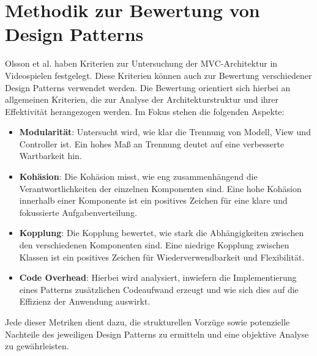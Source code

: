 
\chapter{Methodik zur Bewertung von Design Patterns}
\label{chap:methodik}

Olsson et al. \cite{olsson2015evolution} haben Kriterien zur Untersuchung der \ac{MVC}-Architektur in Videospielen festgelegt. Diese Kriterien können auch zur Bewertung verschiedener Design Patterns verwendet werden. Die Bewertung orientiert sich hierbei an allgemeinen Kriterien, die zur Analyse der Architekturstruktur und ihrer Effektivität herangezogen werden. Im Fokus stehen die folgenden Aspekte:

\begin{itemize}
    \item \textbf{Modularität}: Untersucht wird, wie klar die Trennung von Modell, View und Controller ist. Ein hohes Maß an Trennung deutet auf eine verbesserte Wartbarkeit hin.
    
    \item \textbf{Kohäsion}: Die Kohäsion misst, wie eng zusammenhängend die Verantwortlichkeiten der einzelnen Komponenten sind. Eine hohe Kohäsion innerhalb einer Komponente ist ein positives Zeichen für eine klare und fokussierte Aufgabenverteilung.
    
    \item \textbf{Kopplung}: Die Kopplung bewertet, wie stark die Abhängigkeiten zwischen den verschiedenen Komponenten sind. Eine niedrige Kopplung zwischen Klassen ist ein positives Zeichen für Wiederverwendbarkeit und Flexibilität.
    
    \item \textbf{Code Overhead}: Hierbei wird analysiert, inwiefern die Implementierung eines Patterns zusätzlichen Codeaufwand erzeugt und wie sich dies auf die Effizienz der Anwendung auswirkt.
\end{itemize}

Jede dieser Metriken dient dazu, die strukturellen Vorzüge sowie 
potenzielle Nachteile des jeweiligen Design Patterns zu ermitteln und eine 
objektive Analyse zu gewährleisten.